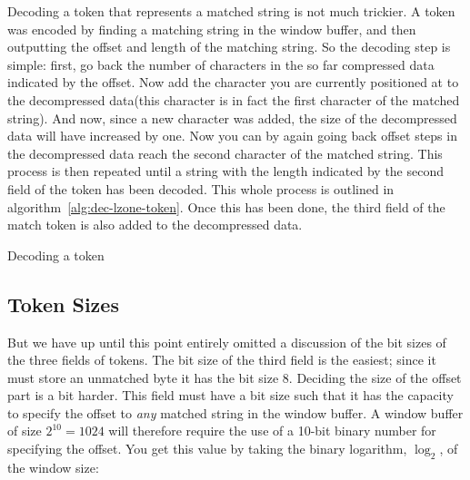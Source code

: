 Decoding a token that represents a matched string is not much
trickier. A token was encoded by finding a matching string in the
window buffer, and then outputting the offset and length of the
matching string. So the decoding step is simple: first, go back the
number of characters in the so far compressed data indicated by the
offset. Now add the character you are currently positioned at to the
decompressed data(this character is in fact the first character of the
matched string). And now, since a new character was added, the size of
the decompressed data will have increased by one. Now you can by again
going back offset steps in the decompressed data reach the second
character of the matched string. This process is then repeated until a
string with the length indicated by the second field of the token has
been decoded. This whole process is outlined in
algorithm~\ref{alg:dec-lzone-token}. Once this has been done, the
third field of the match token is also added to the decompressed data.

\begin{algorithm}[H]
  \caption{Decoding a \lzone token}\algohack{}
  \label{alg:dec-lzone-token}
  \begin{algorithmic}[1]

    \EndRepeatn
  \end{algorithmic}
\end{algorithm}

\subsection{Token Sizes}

But we have up until this point entirely omitted a discussion of the
bit sizes of the three fields of \lzone tokens. The bit size of the
third field is the easiest; since it must store an unmatched byte it
has the bit size 8. Deciding the size of the offset part is a bit
harder. This field must have a bit size such that it has the capacity
to specify the offset to \textit{any} matched string in the window
buffer. A window buffer of size $2^{10} = 1024$ will therefore require
the use of a 10-bit binary number for specifying the offset. You get
this value by taking the binary logarithm, $\log_2$, of the window
size:


